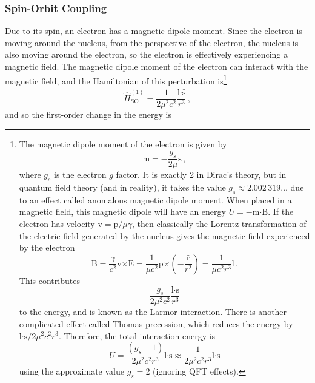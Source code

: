 \documentclass{article}
\theoremstyle{plain}\theoremheaderfont{\normalfont\itshape}\theorembodyfont{\rmfamily}\theoremseparator{.}\newtheorem*{rem}{Remark}\newtheorem*{ex}{Example}\newtheorem*{proof}{Proof}\newtheorem*{altp}{Alternative proof}
\theoremstyle{plain}\theoremheaderfont{\normalfont\bfseries}\theorembodyfont{\rmfamily}\theoremseparator{.}\newtheorem{thm}{Theorem}[section]\newtheorem{lem}[thm]{Lemma}\newtheorem{prop}[thm]{Proposition}\newtheorem*{cor}{Corollary}\newtheorem{defn}[thm]{Definition}\newtheorem{clm}[thm]{Claim}\newtheorem{clminproof}{Claim}
\theoremstyle{break}\theoremheaderfont{\normalfont\itshape}\theorembodyfont{\rmfamily}\theoremseparator{.\medskip}\newtheorem*{proofskip}{Proof}\newtheorem*{exs}{Examples}\newtheorem*{rems}{Remarks}
\theoremstyle{break}\theoremheaderfont{\normalfont\bfseries}\theorembodyfont{\rmfamily}\theoremseparator{.\medskip}\newtheorem{lemskip}[thm]{Lemma}\newtheorem{defnskip}[thm]{Definition}\newtheorem{propskip}[thm]{Proposition}\newtheorem{thmskip}[thm]{Theorem}
\numberwithin{equation}{section}
\newcommand{\vb}[1]{\bm{\mathrm{#1}}}
\newcommand{\vu}[1]{\hat{\bm{\mathrm{#1}}}}
\newcommand{\cross}{\bm{\times}}
\newcommand{\vdot}{\bm{\cdot}}
\begin{document}
    \subsubsection{Spin-Orbit Coupling}
    Due to its spin, an electron has a magnetic dipole moment. Since the electron is moving around the nucleus, from the perspective of the electron, the nucleus is also moving around the electron, so the electron is effectively experiencing a magnetic field. The magnetic dipole moment of the electron can interact with the magnetic field, and the Hamiltonian of this perturbation is\footnote{The magnetic dipole moment of the electron is given by
    \begin{equation}
        \vb{m}=-\frac{g_s}{2\mu}\vb{s}\,,
    \end{equation}
    where \(g_s\) is the electron \(g\) factor. It is exactly 2 in Dirac's theory, but in quantum field theory (and in reality), it takes the value \(g_s\approx 2.002\,319\dots\) due to an effect called anomalous magnetic dipole moment. When placed in a magnetic field, this magnetic dipole will have an energy \(U=-\vb{m}\vdot\vb{B}\). If the electron has velocity \(\vb{v}=\vb{p}/\mu\gamma\), then classically the Lorentz transformation of the electric field generated by the nucleus gives the magnetic field experienced by the electron
    \begin{equation}
        \vb{B}=\frac{\gamma}{c^2}\vb{v}\cross\vb{E}=\frac{1}{\mu c^2}\vb{p}\cross\left(-\frac{\vu{r}}{r^2}\right)=\frac{1}{\mu c^2 r^3}\vb{l}\,.
    \end{equation}
    This contributes
    \begin{equation}
        \frac{g_s}{2\mu^2 c^2}\frac{\vb{l}\vdot\vb{s}}{r^3}
    \end{equation}
    to the energy, and is known as the Larmor interaction. There is another complicated effect called Thomas precession, which reduces the energy by \(\vb{l}\vdot\vb{s}/2\mu^2c^2r^3\). Therefore, the total interaction energy is
    \begin{equation}
        U=\frac{(g_s-1)}{2\mu^2c^2r^3}\vb{l}\vdot\vb{s}\approx \frac{1}{2\mu^2c^2r^3}\vb{l}\vdot\vb{s}
    \end{equation}
    using the approximate value \(g_s=2\) (ignoring QFT effects).}
    \begin{equation}
        \hat{H}_{\text{SO}}^{(1)}=\frac{1}{2\mu^2 c^2}\frac{\hat{\vb{l}}\vdot\hat{\vb{s}}}{r^3}\,,
    \end{equation}
    and so the first-order change in the energy is
\end{document}
